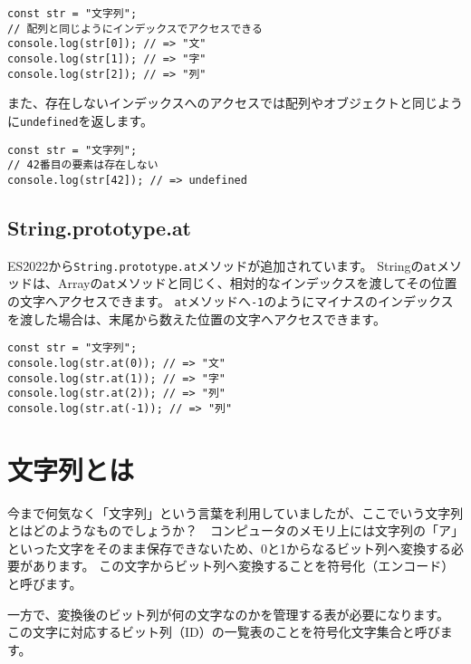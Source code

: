 \begin{lstlisting}
const str = "文字列";
// 配列と同じようにインデックスでアクセスできる
console.log(str[0]); // => "文"
console.log(str[1]); // => "字"
console.log(str[2]); // => "列"
\end{lstlisting}

また、存在しないインデックスへのアクセスでは配列やオブジェクトと同じように\texttt{undefined}を返します。

\begin{lstlisting}
const str = "文字列";
// 42番目の要素は存在しない
console.log(str[42]); // => undefined
\end{lstlisting}

\hypertarget{string-at}{%
\subsection[String.prototype.at]{String.prototype.at\,\protect{}}\label{string-at}}

ES2022から\texttt{String.prototype.at}メソッドが追加されています。
Stringの\texttt{at}メソッドは、Arrayの\texttt{at}メソッドと同じく、相対的なインデックスを渡してその位置の文字へアクセスできます。
\texttt{at}メソッドへ\texttt{-1}のようにマイナスのインデックスを渡した場合は、末尾から数えた位置の文字へアクセスできます。

\begin{lstlisting}
const str = "文字列";
console.log(str.at(0)); // => "文"
console.log(str.at(1)); // => "字"
console.log(str.at(2)); // => "列"
console.log(str.at(-1)); // => "列"
\end{lstlisting}

\hypertarget{what-is-string}{%
\section{文字列とは}\label{what-is-string}}

今まで何気なく「文字列」という言葉を利用していましたが、ここでいう文字列とはどのようなものでしょうか？　コンピュータのメモリ上には文字列の「ア」といった文字をそのまま保存できないため、0と1からなるビット列へ変換する必要があります。
この文字からビット列へ変換することを符号化（エンコード）と呼びます。

一方で、変換後のビット列が何の文字なのかを管理する表が必要になります。
この文字に対応するビット列（ID）の一覧表のことを符号化文字集合と呼びます。

